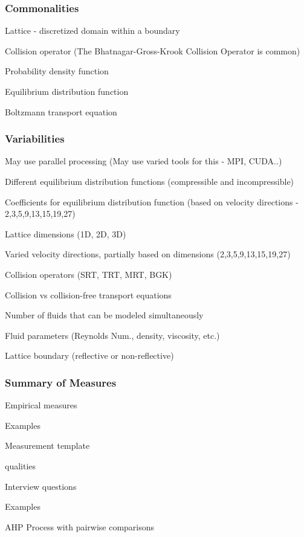 \documentclass[t,12pt,numbers,fleqn]{beamer}
\begin{document}

\begin{frame}
\frametitle{Commonalities}

\bi
	\item Lattice - discretized domain within a boundary
	\item Collision operator (The Bhatnagar-Gross-Krook Collision Operator is common)
	\item Probability density function
	\item Equilibrium distribution function
	\item Boltzmann transport equation
\ei

\end{frame}


\begin{frame}
\frametitle{Variabilities}

\bi
\item May use parallel processing (May use varied tools for this - MPI, CUDA..)
\item Different equilibrium distribution functions (compressible and incompressible)
\item Coefficients for equilibrium distribution function (based on velocity directions - 2,3,5,9,13,15,19,27)
\item Lattice dimensions (1D, 2D, 3D)
\item Varied velocity directions, partially based on dimensions (2,3,5,9,13,15,19,27)
\item Collision operators (SRT, TRT, MRT, BGK)
\item Collision vs collision-free transport equations
\item Number of fluids that can be modeled simultaneously
\item Fluid parameters (Reynolds Num., density, viscosity, etc.)
\item Lattice boundary (reflective or non-reflective)
\ei

\end{frame}


\begin{frame}
\frametitle{Summary of Measures}

\bi
\item Empirical measures
  \bi
  \item Examples
  \ei
\item Measurement template
  \bi
  \item qualities
  \ei
\item Interview questions
  \bi
  \item Examples
  \ei
  \item AHP Process with pairwise comparisons
\ei
\end{frame}
\end{document}
